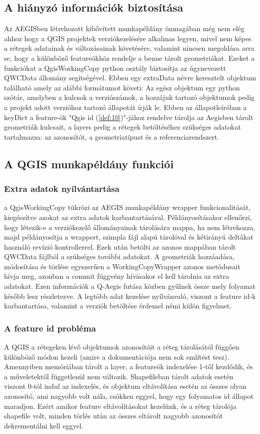 \subsection{A  hiányzó információk biztosítása}
Az AEGISben létrehozott kibővített munkapéldány önmagában még nem elég ahhoz hogy a QGIS projektek verziókezelésére alkalmas legyen, mivel nem képes a rétegek adatainak és változásainak követésére, valamint nincsen megoldása arra se, hogy a különböző featureökhöz rendelje a benne tárolt geometriákat. Ezeket a funkciókat a QgisWorkingCopy python osztály biztosítja az úgynevezett QWCData állomány segítségével. Ebben egy extraData névre keresztelt objektum található amely az alábbi formátumot követi:
Az egész objektum egy python szótár, amelyben a kulcsok a verziószámok, a hozzájuk tartozó objektumok pedig a projekt adott verzióhoz tartozó állapotát írják le. Ebben az állapotleíróban a keyDict a feature-ök "Qgis id (\ref{def:10})"-jához rendelve tárolja az Aegisben tárolt geometriák kulcsait, a layers pedig a rétegek betöltéséhez szükséges adatokat tartalmazza: az azonosítót, a geometriatípust és a referenciarendszert.
\subsection{A QGIS munkapéldány funkciói}
\subsubsection{Extra adatok nyílvántartása}
a QgisWorkingCopy tükrözi az AEGIS munkapéldány wrapper funkcionalitását, kiegészítve azokat az extra adatok karbantartásával. Példányosításakor ellenőrzi, hogy létezik-e a verziókezelő állományainak tárolására mappa, ha nem létrehozza, majd példányosítja a wrappert, szimpla fájl alapú tárolóval és kétirányú deltákat használó revízió kontrollerrel. Ezek után betölti az azonos mappában tárolt QWCData fájlból a szükséges további adatokat.
A geometriák hozzáadása, módosítása és törlése egyszerűen a WorkingCopyWrapper azonos metódusait hívja meg, azonban a commit függvény hívásakor el kell tárolnia az extra adatokat. Ezen információk a Q-Aegis futása közben gyűlnek össze mely folyamat később lesz részletezve. A legtöbb adat kezelése nyílvánvaló, viszont a feature id-k karbantartása, valamint a verziók betöltése érdemel némi külön figyelmet.
\subsubsection{A feature id probléma}
A QGIS a rétegeken lévő objektumok azonosítóit a réteg tárolásától függően különböző módon kezeli (amire a dokumentációja nem sok említést tesz). Amennyiben memóriában tárolt a layer, a featureök indexelése 1-től kezdődik, és a műveletektől függetlenül nem változik. Shapefileban tárolt adatok esetén viszont 0-tól indul az indexelés, és objektum eltávolítása esetén az összes olyan azonosító, ami nagyobb volt nála, csökken eggyel, hogy egy folyamatos id állapot maradjon. Ezért amikor feature eltávolításokat kezelünk, és a réteg tárolója shapefile volt, minden törlés után az összes eltárolt nagyobb azonosítót dekrementálni kell eggyel.
